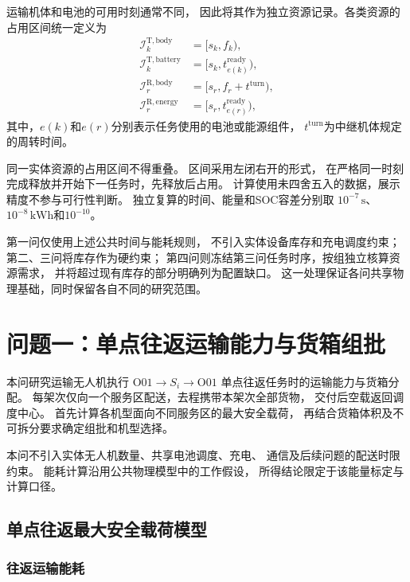 \documentclass[bwprint]{gmcmthesis}
\begin{document}
运输机体和电池的可用时刻通常不同，
因此将其作为独立资源记录。各类资源的占用区间统一定义为
\begin{align}
    \mathcal{I}_k^{\mathrm{T,body}}
    &=[s_k,f_k),\\
    \mathcal{I}_k^{\mathrm{T,battery}}
    &=[s_k,t_{e(k)}^{\mathrm{ready}}),\\
    \mathcal{I}_r^{\mathrm{R,body}}
    &=[s_r,f_r+t^{\mathrm{turn}}),\\
    \mathcal{I}_r^{\mathrm{R,energy}}
    &=[s_r,t_{e(r)}^{\mathrm{ready}}),
\end{align}
其中，$e(k)$和$e(r)$分别表示任务使用的电池或能源组件，
$t^{\mathrm{turn}}$为中继机体规定的周转时间。

同一实体资源的占用区间不得重叠。
区间采用左闭右开的形式，
在严格同一时刻完成释放并开始下一任务时，先释放后占用。
计算使用未四舍五入的数据，展示精度不参与可行性判断。
独立复算的时间、能量和SOC容差分别取
$10^{-7}\,\mathrm{s}$、
$10^{-8}\,\mathrm{kWh}$和$10^{-10}$。

第一问仅使用上述公共时间与能耗规则，
不引入实体设备库存和充电调度约束；
第二、三问将库存作为硬约束；
第四问则冻结第三问任务时序，按组独立核算资源需求，
并将超过现有库存的部分明确列为配置缺口。
这一处理保证各问共享物理基础，同时保留各自不同的研究范围。


\section{问题一：单点往返运输能力与货箱组批}

本问研究运输无人机执行
$\mathrm{O01}\rightarrow S_i\rightarrow\mathrm{O01}$
单点往返任务时的运输能力与货箱分配。
每架次仅向一个服务区配送，去程携带本架次全部货物，
交付后空载返回调度中心。
首先计算各机型面向不同服务区的最大安全载荷，
再结合货箱体积及不可拆分要求确定组批和机型选择。

本问不引入实体无人机数量、共享电池调度、充电、
通信及后续问题的配送时限约束。
能耗计算沿用公共物理模型中的工作假设，
所得结论限定于该能量标定与计算口径。

\subsection{单点往返最大安全载荷模型}

\subsubsection{往返运输能耗}
\end{document}
